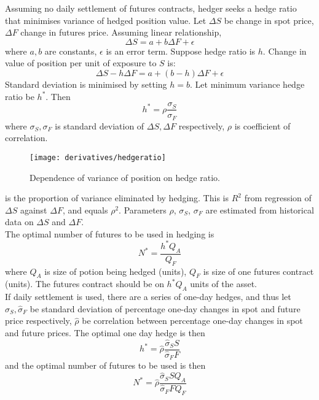 Assuming no daily settlement of futures contracts, hedger seeks a hedge ratio that minimises variance of hedged position value. Let $\Delta S$ be change in spot price, $\Delta F$ change in futures price. Assuming linear relationship,
\begin{equation}
\Delta S = a + b \Delta F + \epsilon	 \nonumber
\end{equation}
where $a,b$ are constants, $\epsilon$ is an error term. Suppose hedge ratio is $h$. Change in value of position per unit of exposure to $S$ is:
\begin{equation}
\Delta S - h \Delta F = a + (b-h) \Delta F + \epsilon \nonumber
\end{equation}
Standard deviation is minimised by setting $h=b$. Let minimum variance hedge ratio be $h^*$. Then
\begin{equation}
h^* = \rho \frac{\sigma_S}{\sigma_F} \nonumber
\end{equation}
where $\sigma_S, \sigma_F$ is standard deviation of $\Delta S, \Delta F$ respectively, $\rho$ is coefficient of correlation.

\begin{figure}[H]
\centering
\texttt{[image: derivatives/hedgeratio]}
\caption{Dependence of variance of position on hedge ratio.}
\end{figure}

 is the proportion of variance eliminated by hedging. This is $R^2$ from regression of $\Delta S$ against $\Delta F$, and equals $\rho^2$. Parameters $\rho$, $\sigma_S$, $\sigma_F$ are estimated from historical data on $\Delta S$ and $\Delta F$.\\

The optimal number of futures to be used in hedging is
\begin{equation}
N^* = \frac{h^* Q_A}{Q_F} \nonumber
\end{equation}
where $Q_A$ is size of potion being hedged (units), $Q_F$ is size of one futures contract (units). The futures contract should be on $h^* Q_A$ units of the asset.\\

If daily settlement is used, there are a series of one-day hedges, and thus let $\hat{\sigma}_S, \hat{\sigma}_F$ be standard deviation of percentage one-day changes in spot and future price respectively, $\hat{\rho}$ be correlation between percentage one-day changes in spot and future prices. The optimal one day hedge is then
\begin{equation}
h^* = \hat{\rho}\frac{\hat{\sigma}_S S}{\hat{\sigma}_F F} \nonumber
\end{equation} 
and the optimal number of futures to be used is then
\begin{equation}
N^* = \hat{\rho}\frac{\hat{\sigma}_S S Q_A}{\hat{\sigma}_F F Q_F} \nonumber
\end{equation}

